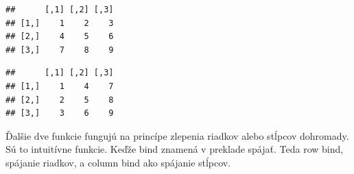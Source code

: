 \begin{Shaded}
\begin{Highlighting}[]
\StringTok{ }\NormalTok{(}\NormalTok{, }\NormalTok{, }\NormalTok{, }\NormalTok{, }\NormalTok{, }\NormalTok{, }\NormalTok{, }\NormalTok{, }\NormalTok{)}

\StringTok{ } \NormalTok{, } \NormalTok{, } \NormalTok{)}

\end{Highlighting}
\end{Shaded}

\begin{verbatim}
##      [,1] [,2] [,3]
## [1,]    1    2    3
## [2,]    4    5    6
## [3,]    7    8    9
\end{verbatim}

\begin{Shaded}
\begin{Highlighting}[]
\StringTok{ } \NormalTok{, } \NormalTok{, } \NormalTok{)}

\end{Highlighting}
\end{Shaded}

\begin{verbatim}
##      [,1] [,2] [,3]
## [1,]    1    4    7
## [2,]    2    5    8
## [3,]    3    6    9
\end{verbatim}

Ďalšie dve funkcie fungujú na princípe zlepenia riadkov alebo stĺpcov
dohromady. Sú to intuitívne funkcie. Keďže bind znamená v preklade
spájať. Teda row bind, spájanie riadkov, a column bind ako spájanie
stĺpcov.

